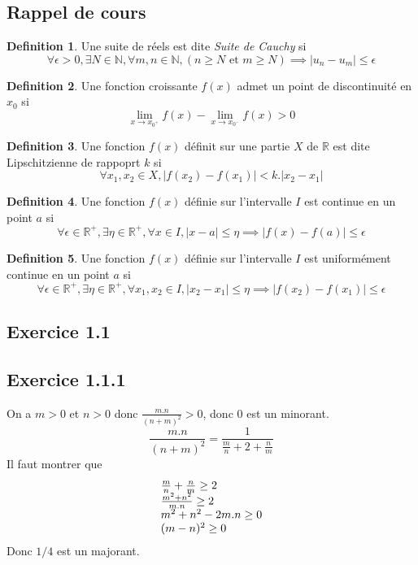\documentclass[]{book}
\theoremstyle{definition}
\newtheorem{defn}{Definition}
\newcommand{\bb}[1]{\mathbb{#1}}
\newcommand{\R}{\bb{R}}
\newcommand{\N}{\bb{N}}
\begin{document}
\subsection*{Rappel de cours}
\begin{defn}
Une suite de r\'eels est dite \emph{Suite de Cauchy} si
$$
\forall \epsilon > 0, \exists N \in \N, \forall m,n \in \N, (n \geq N \text{ et } m \geq N) \implies |u_n - u_m| \leq \epsilon 
$$
\end{defn}

\begin{defn}
Une fonction croissante $f(x)$ admet un point de discontinuit\'e en $x_0$ si 
$$\lim_{x \to x_{0^{+}}}f(x) - \lim_{x \to x_{0^{-}}}f(x) > 0$$
\end{defn}


\begin{defn}
Une fonction $f(x)$ d\'efinit sur une partie $X$ de $\R$ est dite Lipschitzienne de rappoprt $k$ si 
$$
\forall x_1, x_2 \in X, |f(x_2)-f(x_1)| < k.|x_2-x_1|
$$
\end{defn}

\begin{defn}
Une fonction $f(x)$ d\'efinie sur l'intervalle $I$ est continue en un point $a$ si 
$$
\forall \epsilon \in \R^{+}, \exists \eta  \in \R^{+}, \forall x \in I, |x-a| \leq \eta \implies  |f(x)-f(a)| \leq \epsilon
$$
\end{defn}

\begin{defn}
Une fonction $f(x)$ d\'efinie sur l'intervalle $I$ est uniform\'ement continue en un point $a$ si 
$$
\forall \epsilon \in \R^{+}, \exists \eta  \in \R^{+}, \forall x_1, x_2 \in I, |x_2-x_1| \leq \eta \implies  |f(x_2)-f(x_1)| \leq \epsilon
$$
\end{defn}



\newpage
\subsection*{Exercice 1.1}
\subsection*{Exercice 1.1.1}
On a $m > 0$ et $n >0$ donc $\frac{m.n}{(n+m)^2} > 0$, donc 0 est un minorant. 
$$
\frac{m.n}{(n+m)^2} = \frac{1}{\frac{m}{n}+2+\frac{n}{m}}
$$
Il faut montrer que 
$$
\begin{array}{l l}
\frac{m}{n}+\frac{n}{m} \geq 2 \\
\frac{m^2+n^2}{m.n} \geq 2 \\
m^2+n^2-2m.n \geq 0 \\
(m-n)^2 \geq 0 \\
\end{array}
$$
Donc $1/4$ est un majorant.
\end{document}
